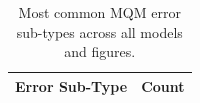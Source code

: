 \begin{table}[t]
\centering
\small
\begin{tabular}{@{}lr@{}}
\toprule
\textbf{Error Sub-Type} & \textbf{Count} \\
\midrule
\bottomrule
\end{tabular}
\caption{Most common MQM error sub-types across all models and figures.}
\label{tab:error-subtypes}
\end{table}